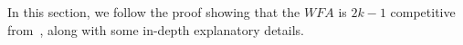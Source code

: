 In this section, we follow the proof showing that the $WFA$ is $2k-1$ competitive from~\cite{OnlineComp1998}, along with some in-depth explanatory details. 